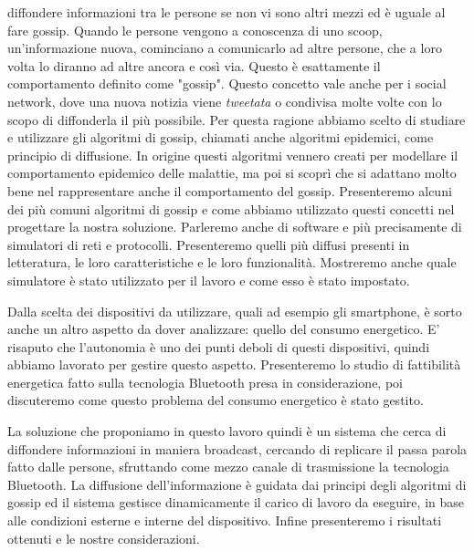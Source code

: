diffondere informazioni tra le persone se non vi sono altri mezzi ed è uguale al fare gossip. Quando le persone vengono a conoscenza di uno scoop, un'informazione nuova, cominciano a comunicarlo ad altre persone, che a loro volta lo diranno ad altre ancora e così via. Questo è esattamente il comportamento definito come "gossip". Questo concetto vale anche per i social network, dove una nuova notizia viene \textit{tweetata} o condivisa molte volte con lo scopo di diffonderla il più possibile. Per questa ragione abbiamo scelto di studiare e utilizzare gli algoritmi di gossip, chiamati anche algoritmi epidemici, come principio di diffusione. In origine questi algoritmi vennero creati per modellare il comportamento epidemico delle malattie, ma poi si scoprì che si adattano molto bene nel rappresentare anche il comportamento del gossip. Presenteremo alcuni dei più comuni algoritmi di gossip e come abbiamo utilizzato questi concetti nel progettare la nostra soluzione. Parleremo anche di software e più precisamente di simulatori di reti e protocolli. Presenteremo quelli più diffusi presenti in letteratura, le loro caratteristiche e le loro funzionalità. Mostreremo anche quale simulatore è stato utilizzato per il lavoro e come esso è stato impostato.

Dalla scelta dei dispositivi da utilizzare, quali ad esempio gli smartphone, è sorto anche un altro aspetto da dover analizzare: quello del consumo energetico. E' risaputo che l'autonomia è uno dei punti deboli di questi dispositivi, quindi abbiamo lavorato per gestire questo aspetto. Presenteremo lo studio di fattibilità energetica fatto sulla tecnologia Bluetooth presa in considerazione, poi discuteremo come questo problema del consumo energetico è stato gestito.

La soluzione che proponiamo in questo lavoro quindi è un sistema che cerca di diffondere informazioni in maniera broadcast, cercando di replicare il passa parola fatto dalle persone, sfruttando come mezzo canale di trasmissione la tecnologia Bluetooth. La diffusione dell'informazione è guidata dai principi degli algoritmi di gossip ed il sistema gestisce dinamicamente il carico di lavoro da eseguire, in base alle condizioni esterne e interne del dispositivo. Infine presenteremo i risultati ottenuti e le nostre considerazioni.

